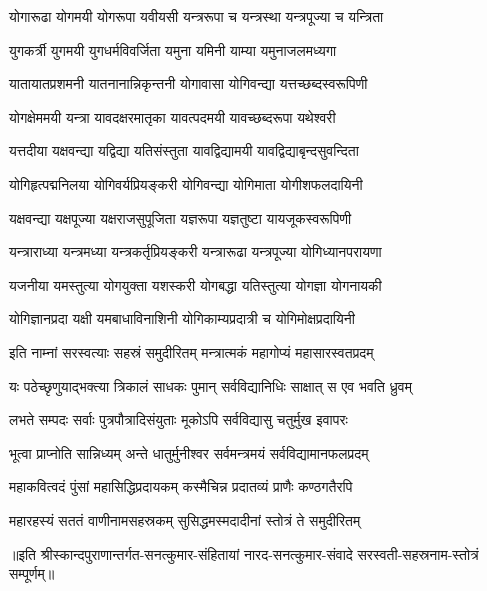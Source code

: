 \twolineshloka
{योगारूढा योगमयी योगरूपा यवीयसी}
{यन्त्ररूपा च यन्त्रस्था यन्त्रपूज्या च यन्त्रिता}%

\twolineshloka
{युगकर्त्री युगमयी युगधर्मविवर्जिता}
{यमुना यमिनी याम्या यमुनाजलमध्यगा}%

\twolineshloka
{यातायातप्रशमनी यातनानान्निकृन्तनी}
{योगावासा योगिवन्द्या यत्तच्छब्दस्वरूपिणी}%

\twolineshloka
{योगक्षेममयी यन्त्रा यावदक्षरमातृका}
{यावत्पदमयी यावच्छब्दरूपा यथेश्वरी}%

\twolineshloka
{यत्तदीया यक्षवन्द्या यद्विद्या यतिसंस्तुता}
{यावद्विद्यामयी यावद्विद्याबृन्दसुवन्दिता}%

\twolineshloka
{योगिहृत्पद्मनिलया योगिवर्यप्रियङ्करी}
{योगिवन्द्या योगिमाता योगीशफलदायिनी}%

\twolineshloka
{यक्षवन्द्या यक्षपूज्या यक्षराजसुपूजिता}
{यज्ञरूपा यज्ञतुष्टा यायजूकस्वरूपिणी}%

\twolineshloka
{यन्त्राराध्या यन्त्रमध्या यन्त्रकर्तृप्रियङ्करी}
{यन्त्रारूढा यन्त्रपूज्या योगिध्यानपरायणा}%

\twolineshloka
{यजनीया यमस्तुत्या योगयुक्ता यशस्करी}
{योगबद्धा यतिस्तुत्या योगज्ञा योगनायकी}%

\twolineshloka
{योगिज्ञानप्रदा यक्षी यमबाधाविनाशिनी}
{योगिकाम्यप्रदात्री च योगिमोक्षप्रदायिनी}%


 \resetShloka

\twolineshloka
{इति नाम्नां सरस्वत्याः सहस्रं समुदीरितम्}
{मन्त्रात्मकं महागोप्यं महासारस्वतप्रदम्}%

\twolineshloka
{यः पठेच्छृणुयाद्भक्त्या त्रिकालं साधकः पुमान्}
{सर्वविद्यानिधिः साक्षात् स एव भवति ध्रुवम्}%

\twolineshloka
{लभते सम्पदः सर्वाः पुत्रपौत्रादिसंयुताः}
{मूकोऽपि सर्वविद्यासु चतुर्मुख इवापरः}%

\twolineshloka
{भूत्वा प्राप्नोति सान्निध्यम् अन्ते धातुर्मुनीश्वर}
{सर्वमन्त्रमयं सर्वविद्यामानफलप्रदम्}%

\twolineshloka
{महाकवित्वदं पुंसां महासिद्धिप्रदायकम्}
{कस्मैचिन्न प्रदातव्यं प्राणैः कण्ठगतैरपि}%

\twolineshloka
{महारहस्यं सततं वाणीनामसहस्रकम्}
{सुसिद्धमस्मदादीनां स्तोत्रं ते समुदीरितम्}%


॥इति श्रीस्कान्दपुराणान्तर्गत-सनत्कुमार-संहितायां नारद-सनत्कुमार-संवादे सरस्वती-सहस्रनाम-स्तोत्रं सम्पूर्णम्॥
